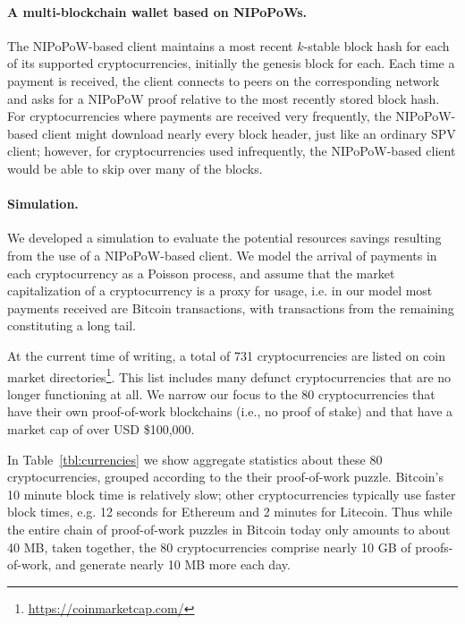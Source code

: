 \paragraph{A multi-blockchain wallet based on NIPoPoWs. }
The NIPoPoW-based client maintains a most recent $k$-stable block hash for each
of its supported cryptocurrencies, initially the genesis block for each. Each
time a payment is received, the client connects to peers on the corresponding
network and asks for a NIPoPoW proof relative to the most recently stored block
hash. For cryptocurrencies where payments are received very frequently, the
NIPoPoW-based client might download nearly every block header, just like an
ordinary SPV client; however, for cryptocurrencies used infrequently, the
NIPoPoW-based client would be able to skip over many of the blocks.

\paragraph{Simulation.}
We developed a simulation to evaluate the potential resources savings resulting
from the use of a NIPoPoW-based client. We model the arrival of payments in
each cryptocurrency as a Poisson process, and assume that the market
capitalization of a cryptocurrency is a proxy for usage, i.e. in our model most
payments received are Bitcoin transactions, with transactions from the
remaining constituting a long tail.

At the current time of writing, a total of 731 cryptocurrencies are listed on
coin market directories\footnote{\url{https://coinmarketcap.com/}}. This list
includes many defunct cryptocurrencies that are no longer functioning at all.
We narrow our focus to the 80 cryptocurrencies that have their own
proof-of-work blockchains
(i.e., no proof of stake) and that have a market cap of over USD \$100,000.

In Table~\ref{tbl:currencies} we show aggregate statistics about these 80 cryptocurrencies, grouped according to the their proof-of-work puzzle.
Bitcoin's 10 minute block time is relatively slow; other cryptocurrencies typically use faster block times, e.g. 12 seconds for Ethereum and 2 minutes for Litecoin. Thus while the entire chain of proof-of-work puzzles in Bitcoin today only amounts to about 40 MB, taken together, the 80 cryptocurrencies comprise nearly 10 GB of proofs-of-work, and generate nearly 10 MB more each day.

